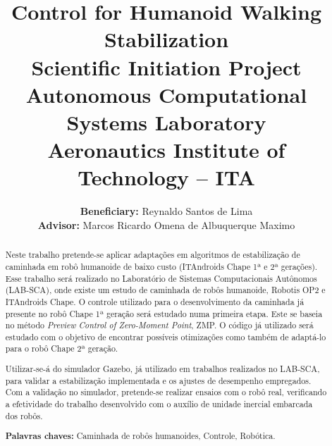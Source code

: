\begin{abstract}
Neste trabalho pretende-se aplicar adaptações em algoritmos de estabilização de caminhada em robô humanoide de baixo custo (ITAndroids Chape 1ª e 2ª gerações). Esse trabalho será realizado no  Laboratório de Sistemas Computacionais Autônomos (LAB-SCA), onde  existe um estudo de caminhada de robôs humanoide, Robotis OP2 e ITAndroids Chape. O controle utilizado para o desenvolvimento da caminhada já presente no robô Chape 1ª geração será estudado numa primeira etapa. Este se baseia no método \textit{Preview Control of Zero-Moment Point}, ZMP. O código já utilizado será estudado com o objetivo de encontrar possíveis otimizações como também de adaptá-lo para o robô Chape 2ª geração.

Utilizar-se-á do simulador Gazebo, já utilizado em trabalhos realizados no LAB-SCA, para validar a estabilização implementada e os ajustes de desempenho empregados. Com a validação no simulador, pretende-se realizar ensaios com o robô real, verificando a efetividade do trabalho desenvolvido com o auxílio de unidade inercial embarcada dos robôs.


\noindent \textbf{Palavras chaves:} Caminhada de robôs humanoides, Controle, Robótica.


\end{abstract}

\title{\textbf{Control for Humanoid Walking Stabilization
}\\
\vspace{30px}
\normalsize \textbf{Scientific Initiation Project}\\
 \textbf{Autonomous Computational Systems Laboratory}\\
 \textbf{Aeronautics Institute of Technology -- ITA}
 }








\author{\textbf{Beneficiary:} Reynaldo Santos de Lima\\
\textbf{Advisor:} Marcos Ricardo Omena de Albuquerque Maximo\\
 } %
 
\maketitle 
 
